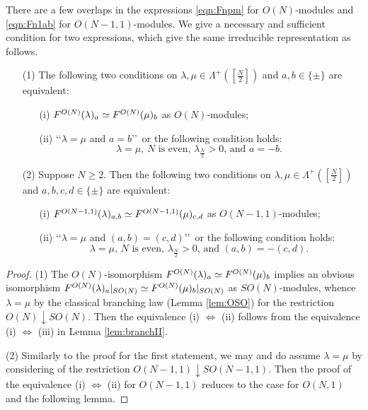 There are a few overlaps in the expressions \eqref{eqn:Fnpm} for 
$O(N)$-modules and \eqref{eqn:Fn1ab} for $O(N-1,1)$-modules.  
We give a necessary and sufficient condition
 for two expressions, 
 which give the same irreducible representation as follows.  
\begin{lemma}
\label{lem:fdeq}
\begin{enumerate}
\item[{\rm{(1)}}]
The following two conditions on $\lambda, \mu \in \Lambda^+([\frac N 2])$
 and $a, b \in \{\pm\}$ are equivalent:
\begin{enumerate}
\item[{\rm{(i)}}]
$F^{{O(N)}}({\lambda})_a \simeq F^{{O(N)}}({\mu})_b$
 as $O(N)$-modules;
\item[{\rm{(ii)}}]
\lq\lq{$\lambda = \mu$ and $a=b$}\rq\rq\
 or the following condition holds:
\begin{equation}
\label{eqn:ONisom}
\text{
$\lambda=\mu$, 
 $N$ is even, $\lambda_{\frac N 2} >0$, 
 and $a=-b$. 
}
\end{equation}
\end{enumerate}
\item[{\rm{(2)}}]
Suppose $N \ge 2$.  
Then the following two conditions on $\lambda, \mu \in \Lambda^+([\frac N 2])$
 and $a, b, c, d \in \{\pm\}$ are equivalent:
\begin{enumerate}
\item[{\rm{(i)}}]
$F^{{O(N-1,1)}}({\lambda})_{a,b} \simeq F^{{O(N-1,1)}}({\mu})_{c,d}$
 as $O(N-1,1)$-modules;
\item[{\rm{(ii)}}]
\lq\lq{$\lambda = \mu$ and $(a,b)=(c,d)$}\rq\rq\
 or the following condition holds:
\begin{equation}
\label{eqn:ON1isom}
\text{
$\lambda=\mu$, 
 $N$ is even, $\lambda_{\frac N 2}>0$, and $(a,b)=-(c,d)$. 
}
\end{equation}
\end{enumerate}
\end{enumerate}
\end{lemma}



\begin{proof}
(1)\enspace
The $O(N)$-isomorphism $F^{{O(N)}}({\lambda})_{a} \simeq F^{{O(N)}}({\mu})_{b}$ implies an obvious isomorphism
 $F^{{O(N)}}({\lambda})_{a}|_{SO(N)} \simeq F^{{O(N)}}({\mu})_{b}|_{SO(N)}$
 as $SO(N)$-modules,
 whence $\lambda=\mu$ by the classical branching law
 (Lemma \ref{lem:OSO})
 for the restriction $O(N) \downarrow SO(N)$.  
Then the equivalence (i) $\Leftrightarrow$ (ii) follows from the equivalence 
(i) $\Leftrightarrow$ (iii) in Lemma \ref{lem:branchII}.  
\par\noindent
(2)\enspace
Similarly to the proof for the first statement,
 we may and do assume $\lambda=\mu$
 by considering of the restriction $O(N-1,1) \downarrow SO(N-1,1)$.  
Then the proof of the equivalence (i) $\Leftrightarrow$ (ii) for $O(N-1,1)$
 reduces to the case for $O(N,1)$
 and the following lemma.  
\end{proof}

